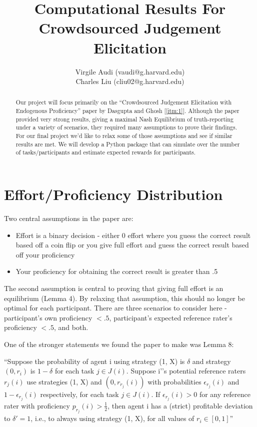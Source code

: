 \documentclass{article}
\title{Computational Results For Crowdsourced Judgement Elicitation}
\author{Virgile Audi (vaudi@g.harvard.edu)\\
		Charles Liu (cliu02@g.harvard.edu)}
\begin{document}
 
\maketitle
 
\begin{abstract}
	Our project will focus primarily on the ``Crowdsourced Judgement Elicitation with Endogenous Proficiency'' paper by Dasgupta and Ghosh [\ref{itm:1}]. Although the paper provided very strong results, giving a maximal Nash Equilibrium of truth-reporting under a variety of scenarios, they required many assumptions to prove their findings. For our final project we'd like to relax some of those assumptions and see if similar results are met. We will develop a Python package that can simulate over the number of tasks/participants and estimate expected rewards for participants.
\end{abstract}

\section{Effort/Proficiency Distribution}
Two central assumptions in the paper are:
\begin{itemize}
	\item Effort is a binary decision - either 0 effort where you guess the correct result based off a coin flip or you give full effort and guess the correct result based off your proficiency
	\item Your proficiency for obtaining the correct result is greater than .5
\end{itemize}

The second assumption is central to proving that giving full effort is an equilibrium (Lemma 4). By relaxing that assumption, this should no longer be optimal for each participant. There are three scenarios to consider here - participant's own proficiency $<.5$, participant's expected reference rater's proficiency $<.5$, and both.

One of the stronger statements we found the paper to make was Lemma 8:
\begin{displayquote}
``Suppose the probability of agent i using strategy (1, X) is $\delta$ and strategy $(0, r_i)$ is $1-\delta$ for each task $j \in J(i)$. Suppose i'’s potential reference raters $r_j (i)$ use strategies (1, X) and $(0, r_{r_j} (i))$ with probabilities $\epsilon_{r_j}(i)$ and $1-\epsilon_{r_j}(i)$ respectively, for each task $j \in J(i)$. If $\epsilon_{r_j}(i) > 0$ for any reference rater with proficiency $p_{r_j} (i) > \frac{1}{2}$, then agent i has a (strict) profitable deviation to $\delta'=1$, i.e., to always using strategy (1, X), for all values of $r_i \in [0,1]$''
\end{displayquote}
\end{document}
